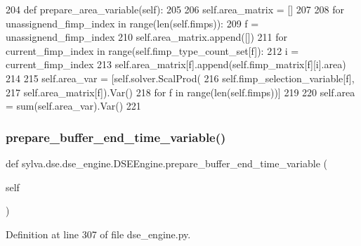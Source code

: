 \begin{DoxyCode}
204     \textcolor{keyword}{def }prepare\_area\_variable(self):
205 
206         self.area\_matrix = []
207 
208         \textcolor{keywordflow}{for} unassignend\_fimp\_index \textcolor{keywordflow}{in} range(len(self.fimps)):
209             f = unassignend\_fimp\_index
210             self.area\_matrix.append([])
211             \textcolor{keywordflow}{for} current\_fimp\_index \textcolor{keywordflow}{in} range(self.fimp\_type\_count\_set[f]):
212                 i = current\_fimp\_index
213                 self.area\_matrix[f].append(self.fimp\_matrix[f][i].area)
214 
215         self.area\_var = [self.solver.ScalProd(
216             self.fimp\_selection\_variable[f],
217             self.area\_matrix[f]).Var()
218             \textcolor{keywordflow}{for} f \textcolor{keywordflow}{in} range(len(self.fimps))]
219 
220         self.area = sum(self.area\_var).Var()
221 
\end{DoxyCode}
\mbox{\label{classsylva_1_1dse_1_1dse__engine_1_1_d_s_e_engine_ac6a6c26525cd5cd62041fb5f6aa26635}} 
\subsubsection{\texorpdfstring{prepare\+\_\+buffer\+\_\+end\+\_\+time\+\_\+variable()}{prepare\_buffer\_end\_time\_variable()}}
{\footnotesize\ttfamily def sylva.\+dse.\+dse\+\_\+engine.\+D\+S\+E\+Engine.\+prepare\+\_\+buffer\+\_\+end\+\_\+time\+\_\+variable (\begin{DoxyParamCaption}\item[{}]{self }\end{DoxyParamCaption})}



Definition at line 307 of file dse\+\_\+engine.\+py.


